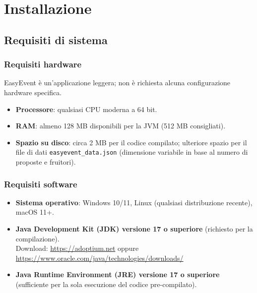\documentclass[12pt,a4paper,oneside]{report}
\newcommand{\file}[1]{\texttt{\small#1}}
\begin{document}
\clearpage

\tableofcontents
\clearpage

\chapter{Installazione}
\label{cap:installazione}

\section{Requisiti di sistema}

\subsection{Requisiti hardware}
EasyEvent è un'applicazione leggera; non è richiesta alcuna configurazione hardware specifica.
\begin{itemize}
  \item \textbf{Processore}: qualsiasi CPU moderna a 64 bit.
  \item \textbf{RAM}: almeno 128 MB disponibili per la JVM (512 MB consigliati).
  \item \textbf{Spazio su disco}: circa 2 MB per il codice compilato; ulteriore spazio per il file di dati \file{easyevent\_data.json} (dimensione variabile in base al numero di proposte e fruitori).
\end{itemize}

\subsection{Requisiti software}
\begin{itemize}
  \item \textbf{Sistema operativo}: Windows 10/11, Linux (qualsiasi distribuzione recente), macOS 11+.
  \item \textbf{Java Development Kit (JDK) versione 17 o superiore} (richiesto per la compilazione). \\
        Download: \url{https://adoptium.net} oppure \url{https://www.oracle.com/java/technologies/downloads/}
  \item \textbf{Java Runtime Environment (JRE) versione 17 o superiore} (sufficiente per la sola esecuzione del codice pre-compilato).
\end{itemize}
\end{document}
